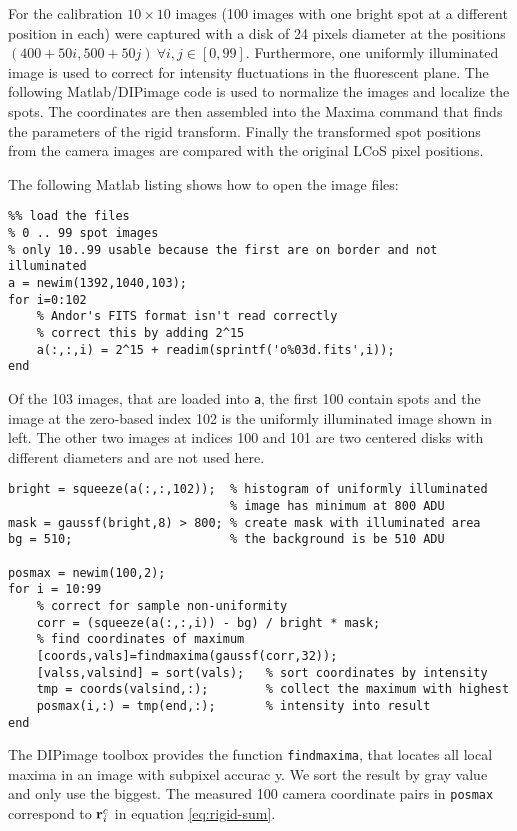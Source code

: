 For the calibration $10\times10$ images (100 images with one bright
spot at a different position in each) were captured with a disk of 24
pixels diameter at the positions $(400+50i,500+50j)\ \forall i,j\in
[0,99]$. Furthermore, one uniformly illuminated image is used to
correct for intensity fluctuations in the fluorescent plane.  The
following Matlab/DIPimage code is used to normalize the images and
localize the spots. The coordinates are then assembled into the Maxima
command that finds the parameters of the rigid transform. Finally the
transformed spot positions from the camera images are compared with
the original LCoS pixel positions.

The following Matlab listing shows how to open the image files:
{\small
\begin{verbatim}
%% load the files
% 0 .. 99 spot images
% only 10..99 usable because the first are on border and not illuminated
a = newim(1392,1040,103);
for i=0:102
    % Andor's FITS format isn't read correctly
    % correct this by adding 2^15
    a(:,:,i) = 2^15 + readim(sprintf('o%03d.fits',i));
end
\end{verbatim}}

  Of the 103 images, that are loaded into \verb!a!, the first 100
  contain spots and the image at the zero-based index 102 is the
  uniformly illuminated image shown in  left.
  The other two images at indices 100 and 101 are two centered disks
  with different diameters and are not used here.

{\small
\begin{verbatim}
bright = squeeze(a(:,:,102));  % histogram of uniformly illuminated
                               % image has minimum at 800 ADU
mask = gaussf(bright,8) > 800; % create mask with illuminated area
bg = 510;                      % the background is be 510 ADU

posmax = newim(100,2);
for i = 10:99
    % correct for sample non-uniformity 
    corr = (squeeze(a(:,:,i)) - bg) / bright * mask;
    % find coordinates of maximum
    [coords,vals]=findmaxima(gaussf(corr,32));
    [valss,valsind] = sort(vals);   % sort coordinates by intensity
    tmp = coords(valsind,:);        % collect the maximum with highest
    posmax(i,:) = tmp(end,:);       % intensity into result
end
\end{verbatim}}
  
  The DIPimage toolbox provides the function \verb!findmaxima!, that
  locates all local maxima in an image with subpixel accurac y. We
  sort the result by gray value and only use the biggest.  The
  measured 100 camera coordinate pairs in \verb!posmax! correspond to
  $\mathbf{r}^c_i$ in equation \ref{eq:rigid-sum}.
 
